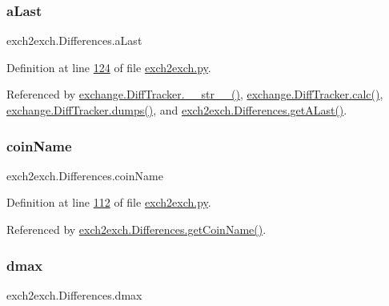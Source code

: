\subsubsection{\texorpdfstring{a\+Last}{aLast}}
{\footnotesize\ttfamily exch2exch.\+Differences.\+a\+Last}



Definition at line \hyperlink{exch2exch_8py_source_l00124}{124} of file \hyperlink{exch2exch_8py_source}{exch2exch.\+py}.



Referenced by \hyperlink{exchange_8py_source_l00336}{exchange.\+Diff\+Tracker.\+\_\+\+\_\+str\+\_\+\+\_\+()}, \hyperlink{exchange_8py_source_l00309}{exchange.\+Diff\+Tracker.\+calc()}, \hyperlink{exchange_8py_source_l00385}{exchange.\+Diff\+Tracker.\+dumps()}, and \hyperlink{exch2exch_8py_source_l00145}{exch2exch.\+Differences.\+get\+A\+Last()}.

\mbox{\label{classexch2exch_1_1_differences_a0fb17548553b86b0ae62c2ef1a30981b}} 
\subsubsection{\texorpdfstring{coin\+Name}{coinName}}
{\footnotesize\ttfamily exch2exch.\+Differences.\+coin\+Name}



Definition at line \hyperlink{exch2exch_8py_source_l00112}{112} of file \hyperlink{exch2exch_8py_source}{exch2exch.\+py}.



Referenced by \hyperlink{exch2exch_8py_source_l00151}{exch2exch.\+Differences.\+get\+Coin\+Name()}.

\mbox{\label{classexch2exch_1_1_differences_a261a74cc25d77b2608898fa5611f9f0b}} 
\subsubsection{\texorpdfstring{dmax}{dmax}}
{\footnotesize\ttfamily exch2exch.\+Differences.\+dmax}




